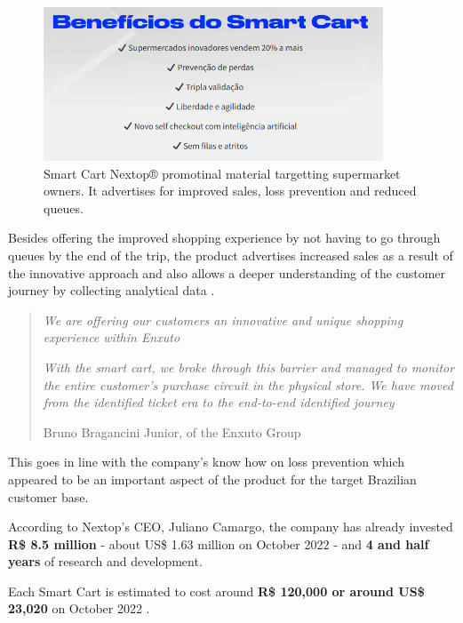 \documentclass[openright]{normas-utf-tex} %
\begin{document}
\begin{figure}[H]
	\centering
	\includegraphics[width=0.9\textwidth]{./images/nextoppromo.png}
    \caption[Smart Cart Nextop® promotional material targetting supermarket owners]{Smart Cart Nextop® promotinal material targetting supermarket owners. It advertises for improved sales, loss prevention and reduced queues.}
	\label{fig:nextopui}
\end{figure}

Besides offering the improved shopping experience by not having to go through queues by the end of the trip, the product advertises increased sales
as a result of the innovative approach and also allows a deeper understanding of the customer journey by collecting analytical data \cite{Paraiba2022}.

\begin{quote}
\textit{We are offering our customers an innovative and unique shopping experience within Enxuto}

\textit{With the smart cart, we broke through this barrier and managed to monitor the
entire customer's purchase circuit in the physical store. We have moved
from the identified ticket era to the end-to-end identified journey}

    Bruno Bragancini Junior,  of the Enxuto Group \cite{Paraiba2022}
\end{quote}


This goes in line with the
company's know how on loss prevention which appeared to be an important aspect
of the product for the target Brazilian customer base.


According to Nextop's CEO, Juliano Camargo, the company has already invested \textbf{R\$ 8.5 million} - about US\$ 1.63 million on October 2022 - and \textbf{4 and half years}
of research and development.

Each Smart Cart is estimated to cost around \textbf{R\$ 120,000  or around US\$ 23,020} on October 2022 \cite{Paraiba2022}.
\end{document}
